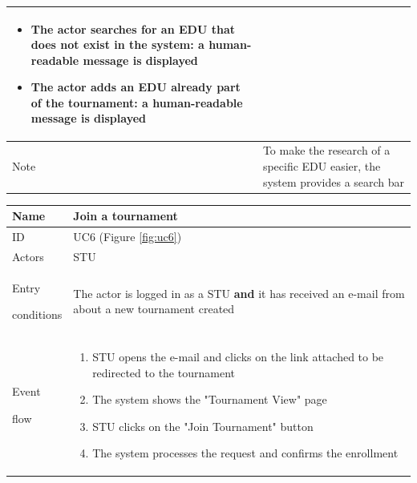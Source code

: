 \begin{center}
\begin{tabular}{| m{2cm} | m{10cm}|}
\begin{itemize}
                                    \item The actor searches for an EDU that does not exist in the system: a human-readable message is displayed
                                    \item The actor adds an EDU already part of the tournament: a human-readable message is displayed
                                \end{itemize}         \\ \hline
        Note                  & To make the research of a specific EDU easier, the system provides a search bar                                      \\ \hline
    \end{tabular}
\end{center}

\begin{center}
    \def\arraystretch{1.5}
    \begin{tabular}{| m{2cm} | m{10cm}|}
        \hline
        Name                  & Join a tournament                                                                                          \\ \hline
        ID                    & UC6 (Figure \ref{fig:uc6})                                                                                 \\ \hline
        Actors                & STU                                                                                                        \\ \hline
        Entry \par conditions & The actor is logged in as a STU \textbf{and} it has received an e-mail from about a new tournament created \\ \hline
        Event \par flow       & \begin{enumerate}
                                    \item STU opens the e-mail and clicks on the link attached to be redirected to the tournament
                                    \item The system shows the "Tournament View" page
                                    \item STU clicks on the "Join Tournament" button
                                    \item The system processes the request and confirms the enrollment
                                \end{enumerate}               \\ \hline

\end{tabular}
\end{center}
